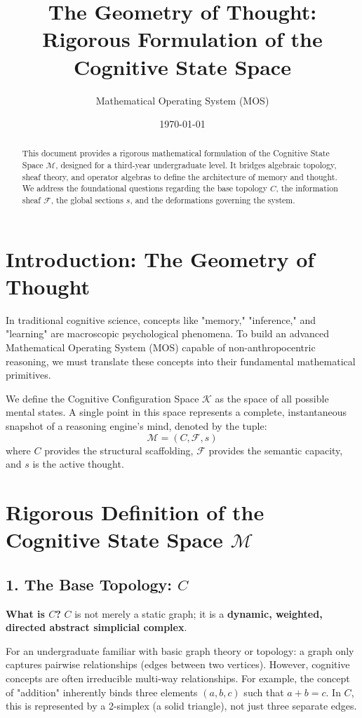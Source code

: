 \documentclass[12pt]{article}
\title{The Geometry of Thought: \\ Rigorous Formulation of the Cognitive State Space}
\author{Mathematical Operating System (MOS)}
\date{\today}
\begin{document}
\maketitle

\begin{abstract}
This document provides a rigorous mathematical formulation of the Cognitive State Space $\mathcal{M}$, designed for a third-year undergraduate level. It bridges algebraic topology, sheaf theory, and operator algebras to define the architecture of memory and thought. We address the foundational questions regarding the base topology $C$, the information sheaf $\mathcal{F}$, the global sections $s$, and the deformations governing the system.
\end{abstract}

\section{Introduction: The Geometry of Thought}
In traditional cognitive science, concepts like "memory," "inference," and "learning" are macroscopic psychological phenomena. To build an advanced Mathematical Operating System (MOS) capable of non-anthropocentric reasoning, we must translate these concepts into their fundamental mathematical primitives. 

We define the Cognitive Configuration Space $\mathcal{K}$ as the space of all possible mental states. A single point in this space represents a complete, instantaneous snapshot of a reasoning engine's mind, denoted by the tuple:
$$ \mathcal{M} = (C, \mathcal{F}, s) $$
where $C$ provides the structural scaffolding, $\mathcal{F}$ provides the semantic capacity, and $s$ is the active thought. 

\section{Rigorous Definition of the Cognitive State Space $\mathcal{M}$}

\subsection{1. The Base Topology: $C$}
\textbf{What is $C$?} 
$C$ is not merely a static graph; it is a \textbf{dynamic, weighted, directed abstract simplicial complex}. 

For an undergraduate familiar with basic graph theory or topology: a graph only captures pairwise relationships (edges between two vertices). However, cognitive concepts are often irreducible multi-way relationships. For example, the concept of "addition" inherently binds three elements $(a, b, c)$ such that $a + b = c$. In $C$, this is represented by a 2-simplex (a solid triangle), not just three separate edges.
\end{document}
